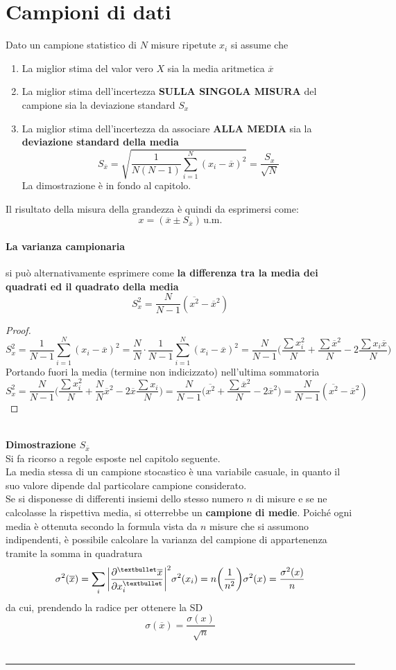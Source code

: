 \documentclass[10pt, oneside]{book}
\newcommand{\infobox}[2]{\vspace{0.5cm}~\\ \textbf{#1} \hrulefill \vspace{0.2cm}\\#2 {}\,\\\hrule \vspace{0.5cm}}
\begin{document}
\section{Campioni di dati}
Dato un campione statistico di $N$ misure ripetute $x_i$ si assume che
\begin{enumerate}
\item La miglior stima del valor vero $X$ sia la media aritmetica $\overline{x}$
\item La miglior stima dell'incertezza \textbf{SULLA SINGOLA MISURA} del campione sia la deviazione standard $S_x$
\item La miglior stima dell'incertezza da associare \textbf{ALLA MEDIA} sia la \textbf{deviazione standard della media}
\[S_{\overline{x}} = \sqrt{\frac{1}{N(N-1)} \sum_{i=1}^N (x_i - \overline{x})^2} = \frac{S_x}{\sqrt{N}}\]
La dimostrazione è in fondo al capitolo.
\end{enumerate}
Il risultato della misura della grandezza è quindi da esprimersi come:
\[x = (\overline{x} \pm S_{\overline{x}}) \, \mathrm{u.m.}\]
\paragraph{La varianza campionaria} si può alternativamente esprimere come \textbf{la differenza tra la media dei quadrati ed il quadrato della media}
\[S_x^2 = \frac{N}{N-1}(\overline{x^2} - \overline{x}^2)\]
\begin{proof}
\[S_x^2 = \frac{1}{N-1} \sum\limits_{i=1}^N (x_i - \overline{x})^2 = \frac{N}{N} \cdot \frac{1}{N-1} \sum\limits_{i=1}^N (x_i - \overline{x})^2 = \frac{N}{N-1} \bigg(\frac{\sum x_i^2}{N} + \frac{\sum \overline{x}^2}{N} - 2 \frac{\sum x_i \overline{x}}{N}\bigg)\]
Portando fuori la media (termine non indicizzato) nell'ultima sommatoria
\[S_x^2 = \frac{N}{N-1} \bigg(\frac{\sum x_i^2}{N} + \frac{N}{N} \overline{x}^2 - 2 \overline{x} \frac{\sum x_i}{N}\bigg) = \frac{N}{N-1} \bigg(\overline{x^2} + \frac{\sum \overline{x}^2}{N} - 2 \overline{x}^2 \bigg) = \frac{N}{N-1}(\overline{x^2} - \overline{x}^2)\]
\end{proof}

\infobox{Dimostrazione $S_{\overline{x}}$}{
Si fa ricorso a regole esposte nel capitolo seguente.\\
La media stessa di un campione stocastico è una variabile casuale, in quanto il suo valore dipende dal particolare campione considerato.\\
Se si disponesse di differenti insiemi dello stesso numero $n$ di misure e se ne calcolasse la rispettiva media, si otterrebbe un \textbf{campione di medie}. Poiché ogni media è ottenuta secondo la formula vista da $n$ misure che si assumono indipendenti, è possibile calcolare la varianza del campione di appartenenza tramite la somma in quadratura
\[\sigma^2(\overline{x}) = \sum_i \bigg|\pdv[•]{\overline{x}}{x_i}\bigg|^2 \sigma^2(x_i) = n \bigg(\frac{1}{n^2}\bigg) \sigma^2(x) = \frac{\sigma^2(x)}{n}\]
da cui, prendendo la radice per ottenere la SD
\[\sigma(\overline{x}) = \frac{\sigma(x)}{\sqrt{n}}\]
}
\end{document}
